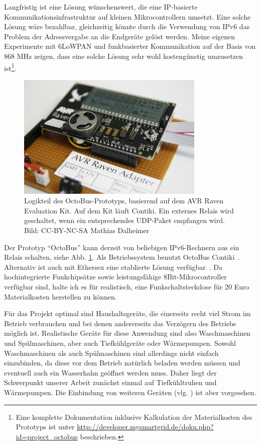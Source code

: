 \documentclass[12pt,BCOR=8.5mm]{scrartcl}
\newcommand*\imgwidth{0.8\textwidth}
\begin{document}
Langfristig ist eine Lösung wünschenswert, die eine IP-basierte
Kommunikationsinfrastruktur auf kleinen Mikrocontrollern umsetzt. Eine
solche Lösung wäre bezahlbar, gleichzeitig könnte durch die Verwendung
von IPv6 das Problem der Adressvergabe an die Endgeräte gelöst werden.
Meine eigenen Experimente mit 6LoWPAN und funkbasierter Kommunikation
auf der Basis von 868 MHz zeigen, dass eine solche Lösung sehr wohl
kostengünstig umzusetzen ist\footnote{Eine komplette Dokumentation
inklusive Kalkulation der Materialkosten des
Prototyps ist unter
\url{http://developer.mysmartgrid.de/doku.php?id=project_octobus}
beschrieben.}.
\begin{figure}[htbp]
  \begin{center}
    \includegraphics[width=\imgwidth]{figures/raven-adapter.JPG}
    \caption{Logikteil des OctoBus-Prototyps, basierend auf dem AVR
    Raven Evaluation Kit. Auf dem Kit läuft Contiki. Ein externes Relais
    wird geschaltet, wenn ein entsprechendes UDP-Paket empfangen wird.
    Bild: CC-BY-NC-SA Mathias Dalheimer}
    \label{fig:raven-adapter}
  \end{center}
\end{figure}
Der Prototyp "`OctoBus"' kann derzeit von beliebigen IPv6-Rechnern aus
ein Relais schalten, siehe Abb. \ref{fig:raven-adapter}.  Als
Betriebssystem benutzt OctoBus Contiki~\cite{yazar09efficient}.
Alternativ ist auch mit Ethersex eine etablierte Lösung
verfügbar~\cite{web:ethersex}. Da hochintegrierte Funkchipsätze sowie leistungsfähige
8Bit-Mikrocontroller verfügbar sind, halte ich es für realistisch, eine
Funkschaltsteckdose für 20 Euro Materialkosten herstellen zu
können.

Für das Projekt optimal sind Haushaltsgeräte, die einerseits recht viel
Strom im Betrieb verbrauchen und bei denen andererseits das Verzögern
des Betriebs möglich ist. Realistische Geräte für diese Anwendung sind
also Waschmaschinen und Spülmaschinen, aber auch Tiefkühlgeräte oder
Wärmepumpen. Sowohl Waschmaschinen als auch Spülmaschinen sind
allerdings nicht einfach einzubinden, da diese vor dem Betrieb natürlich
beladen werden müssen und eventuell auch ein Wasserhahn geöffnet werden
muss. Daher liegt der Schwerpunkt unserer Arbeit zunächst einmal auf
Tiefkühltruhen und Wärmepumpen. Die Einbindung von weiteren Geräten
(vlg. \cite[S. 22]{wiechmann08lastmanagement}) ist aber vorgesehen.
\end{document}
